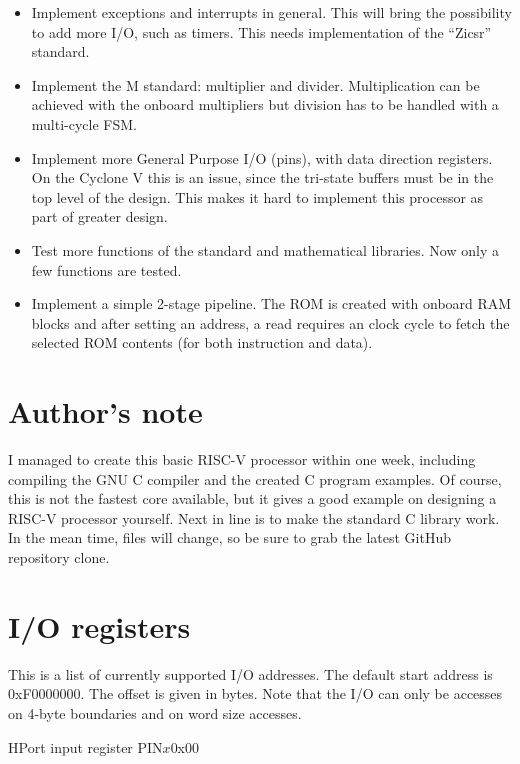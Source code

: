 \documentclass[12pt]{article}
\begin{document}
\begin{itemize}
\item Implement exceptions and interrupts in general. This will bring the possibility to add more I/O, such as timers. This needs implementation of the ``Zicsr'' standard.
\item Implement the M standard: multiplier and divider. Multiplication can be achieved with the onboard multipliers but division has to be handled with a multi-cycle FSM.
\item Implement more General Purpose I/O (pins), with data direction registers. On the Cyclone V this is an issue, since the tri-state buffers must be in the top level of the design. This makes it hard to implement this processor as part of greater design.
\item Test more functions of the standard and mathematical libraries. Now only a few functions are tested.
\item Implement a simple 2-stage pipeline. The ROM is created with onboard RAM blocks and after setting an address, a read requires an clock cycle to fetch the selected ROM contents (for both instruction and data).
\end{itemize}

\section{Author's note}
I managed to create this basic RISC-V processor within one week, including compiling the GNU C compiler and the created C program examples. Of course, this is not the fastest core available, but it gives a good example on designing a RISC-V processor yourself. Next in line is to make the standard C library work. In the mean time, files will change, so be sure to grab the latest GitHub repository clone.

\appendix
\section{I/O registers}

This is a list of currently supported I/O addresses. 
The default start address is 0xF0000000. The offset is given in bytes. Note that the I/O can only be accesses on 4-byte boundaries and on word size accesses.

\begin{register}{H}{Port input register PIN$x$}{0x00}%
\label{pinx}%
\regnewline%
\end{register}
\end{document}
